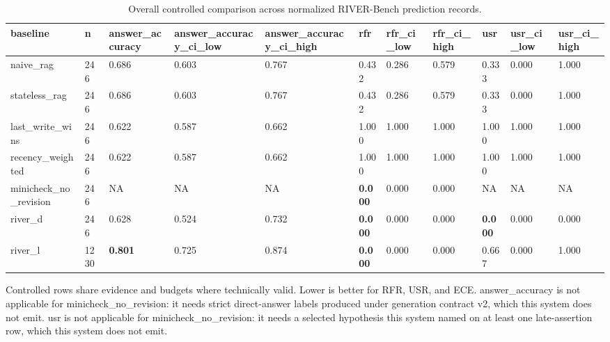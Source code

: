 \begin{table}
\centering
\caption{Overall controlled comparison across normalized RIVER-Bench prediction records.}
\begin{tabular}{lllllllllll}
baseline & n & answer\_accuracy & answer\_accuracy\_ci\_low & answer\_accuracy\_ci\_high & rfr & rfr\_ci\_low & rfr\_ci\_high & usr & usr\_ci\_low & usr\_ci\_high \\ \hline
naive\_rag & 246 & 0.686 & 0.603 & 0.767 & 0.432 & 0.286 & 0.579 & 0.333 & 0.000 & 1.000 \\
stateless\_rag & 246 & 0.686 & 0.603 & 0.767 & 0.432 & 0.286 & 0.579 & 0.333 & 0.000 & 1.000 \\
last\_write\_wins & 246 & 0.622 & 0.587 & 0.662 & 1.000 & 1.000 & 1.000 & 1.000 & 1.000 & 1.000 \\
recency\_weighted & 246 & 0.622 & 0.587 & 0.662 & 1.000 & 1.000 & 1.000 & 1.000 & 1.000 & 1.000 \\
minicheck\_no\_revision & 246 & NA & NA & NA & \textbf{0.000} & 0.000 & 0.000 & NA & NA & NA \\
river\_d & 246 & 0.628 & 0.524 & 0.732 & \textbf{0.000} & 0.000 & 0.000 & \textbf{0.000} & 0.000 & 0.000 \\
river\_l & 1230 & \textbf{0.801} & 0.725 & 0.874 & \textbf{0.000} & 0.000 & 0.000 & 0.667 & 0.000 & 1.000 \\
\end{tabular}
\footnotesize{Controlled rows share evidence and budgets where technically valid.}
\footnotesize{Lower is better for RFR, USR, and ECE.}
\footnotesize{answer\_accuracy is not applicable for minicheck\_no\_revision: it needs strict direct-answer labels produced under generation contract v2, which this system does not emit.}
\footnotesize{usr is not applicable for minicheck\_no\_revision: it needs a selected hypothesis this system named on at least one late-assertion row, which this system does not emit.}
\end{table}
